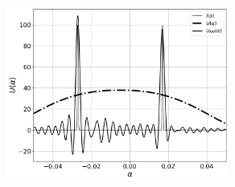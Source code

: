 \documentclass{article}
\begin{document}
	\begin{figure}[h]
		\centering
		\includegraphics[width=0.65\textwidth]{Complete2_target_bw.png}
		\caption{}
		\label{fig:5}
	\end{figure}
		
	\begin{figure}[h]
		\centering
		\caption{}
		\label{fig:6}
	\end{figure}
	
\end{document}
